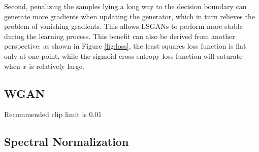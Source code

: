 Second, penalizing the samples lying a long way to the decision boundary can generate more gradients when updating the generator, which in turn relieves the problem of vanishing gradients. This allows LSGANs to perform more stable during the learning process. This benefit can also be derived from another perspective: as shown in Figure \ref{fig:loss}, the least squares loss function is flat only at one point, while the sigmoid cross entropy loss function will saturate when $x$ is relatively large.

\subsection{WGAN}



Recommended clip limit is 0.01

\subsection{Spectral Normalization}



